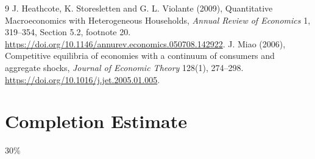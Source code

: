 \documentclass[11pt]{article}
\theoremstyle{remark}
\begin{document}
\begin{thebibliography}{9}
 J. Heathcote, K. Storesletten and G. L. Violante (2009),
Quantitative Macroeconomics with Heterogeneous Households,
\emph{Annual Review of Economics} 1, 319--354, Section 5.2, footnote 20.
\url{https://doi.org/10.1146/annurev.economics.050708.142922}.
 J. Miao (2006), Competitive equilibria of economies with
a continuum of consumers and aggregate shocks,
\emph{Journal of Economic Theory} 128(1), 274--298.
\url{https://doi.org/10.1016/j.jet.2005.01.005}.
\end{thebibliography}

\section{Completion Estimate}
30\%
\end{document}
